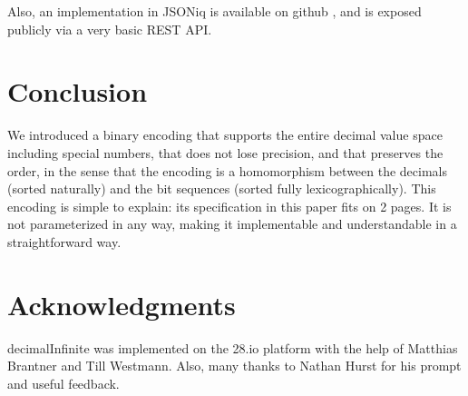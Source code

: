 \documentclass{acm_proc_article-sp}
\begin{document}
Also, an implementation in JSONiq is available on github \cite{decimalInfiniteJSONiq}, and is exposed publicly via a very basic REST API.

\section{Conclusion}

We introduced a binary encoding that supports the entire decimal value space including special numbers, that does not lose precision, and that preserves the order, in the sense that the encoding is a homomorphism between the decimals (sorted naturally) and the bit sequences (sorted fully lexicographically). This encoding is simple to explain: its specification in this paper fits on 2 pages. It is not parameterized in any way, making it implementable and understandable in a straightforward way.

\section{Acknowledgments}
decimalInfinite was implemented on the 28.io platform with the help of Matthias Brantner and Till Westmann. Also, many thanks to Nathan Hurst for his prompt and useful feedback.



\end{document}
